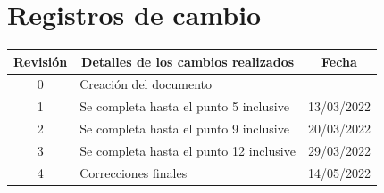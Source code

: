 \documentclass[
11pt, %
codirector, %
]{charter}
\begin{document}
\maketitle
\thispagestyle{empty}
\pagebreak


\thispagestyle{empty}
{\setlength{\parskip}{0pt}
	\tableofcontents{}
}
\pagebreak


\section*{Registros de cambio}
\label{sec:registro}


\begin{table}[ht]
	\label{tab:registro}
	\centering
	\begin{tabularx}{\linewidth}{@{}|c|X|c|@{}}
		\hline
		\rowcolor[HTML]{C0C0C0}
		Revisión & \multicolumn{1}{c|}{\cellcolor[HTML]{C0C0C0}Detalles de los cambios realizados} & Fecha            \\ \hline
		0        & Creación del documento                                                          & \fechaInicioName \\ \hline
		1        & Se completa hasta el punto 5 inclusive                                          & 13/03/2022       \\ \hline
		2        & Se completa hasta el punto 9 inclusive                                          & 20/03/2022       \\ \hline
		3        & Se completa hasta el punto 12 inclusive                                         & 29/03/2022       \\ \hline
		4        & Correcciones finales                                                            & 14/05/2022       \\ \hline

	\end{tabularx}
\end{table}

\pagebreak
\end{document}
